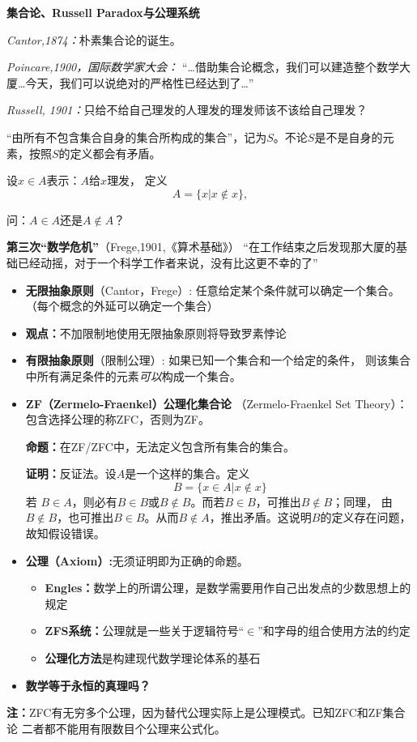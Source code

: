 \begin{shaded}

{\bf 集合论、Russell Paradox与公理系统}

	{\it Cantor,1874：}朴素集合论的诞生。	

	{\it Poincare,1900，国际数学家大会：} 
		 {“\ldots 借助集合论概念，我们可以建造整个数学大厦\ldots  今天，我们可以说绝对的严格性已经达到了\ldots”}
	
	{\it Russell, 1901：}只给不给自己理发的人理发的理发师该不该给自己理发？
	
	“由所有不包含集合自身的集合所构成的集合”，记为$S$。不论$S$是不是自身的元素，按照$S$的定义都会有矛盾。
	
	设$x\in A$表示：$A$给$x$理发， 定义
	$$A=\{x|x\notin x\},$$ 
	
	问：$A\in A$还是$A\notin A$？ 
	
	{{\bf {第三次“数学危机”}}（Frege,1901,《算术基础》）}
		“在工作结束之后发现那大厦的基础已经动摇，对于一个科学工作者来说，没有比这更不幸的了”
		
	\begin{itemize}
	  \item {{\bf 无限抽象原则}（Cantor，Frege）:} 任意给定某个条件就可以确定一个集合。（每个概念的外延可以确定一个集合）
	  \item {\bf 观点：}不加限制地使用无限抽象原则将导致罗素悖论
	  \item {{\bf 有限抽象原则}（限制公理）:} 如果已知一个集合和一个给定的条件，
	  则该集合中所有满足条件的元素{\it 可以}构成一个集合。
	  \item {\bf ZF（Zermelo-Fraenkel）公理化集合论}
	  （Zermelo-Fraenkel Set Theory）：包含选择公理的称ZFC，否则为ZF。
	  
	  {\bf 命题：}在ZF/ZFC中，无法定义包含所有集合的集合。
	
	{\bf 证明：}反证法。设$A$是一个这样的集合。定义
	$$B=\{x\in A|x\notin x\}$$
	若
	$B\in A$，则必有$B\in B$或$B\notin B$。而若$B\in B$，可推出$B\notin B$；同理，
	由$B\notin B$，也可推出$B\in B$。从而$B\notin A$，推出矛盾。这说明$B$的定义存在问题，故知假设错误。

	\item {\bf 公理（Axiom）:}无须证明即为正确的命题。
	\begin{itemize}
	  \item {\bf Engles：}数学上的所谓公理，是数学需要用作自己出发点的少数思想上的规定 
	  \item {\bf ZFS系统：}公理就是一些关于逻辑符号{“$\in$”}和{字母}的组合使用方法的约定
	  \item {\bf 公理化方法}是构建现代数学理论体系的基石
	\end{itemize}
	\item {\bf {数学等于永恒的真理吗？}}
	\end{itemize}
	
	{\bf 注：}ZFC有无穷多个公理，因为替代公理实际上是公理模式。已知ZFC和ZF集合论
	二者都不能用有限数目个公理来公式化。
\end{shaded}
	
